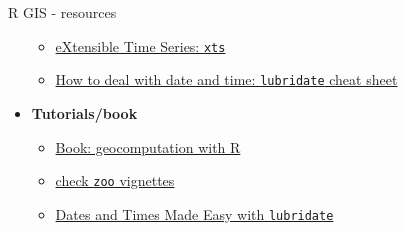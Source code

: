 \documentclass[8pt,ignorenonframetext,]{beamer}
\providecommand{\tightlist}{%
  \setlength{\itemsep}{0pt}\setlength{\parskip}{0pt}}
\begin{document}
\begin{frame}[fragile]{R GIS - resources}
\begin{itemize}
  \begin{itemize}
  \tightlist
  \item
    \href{https://s3.amazonaws.com/assets.datacamp.com/blog_assets/xts_Cheat_Sheet_R.pdf}{eXtensible
    Time Series: \texttt{xts}}
  \item
    \href{https://github.com/rstudio/cheatsheets/raw/master/lubridate.pdf}{How
    to deal with date and time: \texttt{lubridate} cheat sheet}
  \end{itemize}
\item
  \textbf{Tutorials/book}

  \begin{itemize}
  \tightlist
  \item
    \href{https://bookdown.org/robinlovelace/geocompr}{Book:
    geocomputation with R}
  \item
    \href{https://cran.r-project.org/web/packages/zoo/index.html}{check
    \texttt{zoo} vignettes}
  \item
    \href{http://vita.had.co.nz/papers/lubridate.pdf}{Dates and Times
    Made Easy with \texttt{lubridate}}
  \end{itemize}
\end{itemize}

\end{frame}
\end{document}
